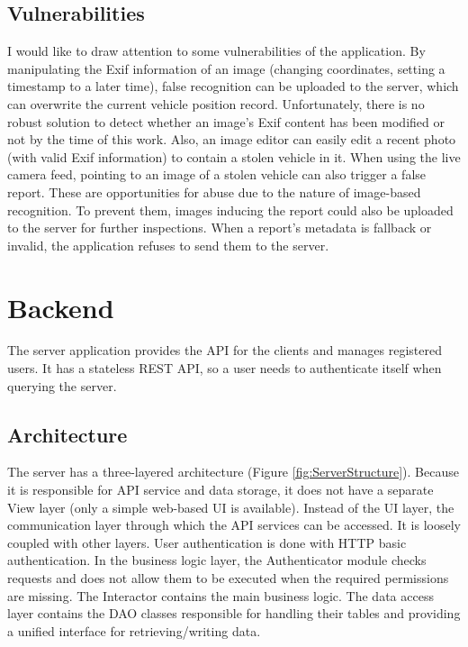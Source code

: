 \subsection{Vulnerabilities}

I would like to draw attention to some vulnerabilities of the application. By manipulating the Exif information of an image (changing coordinates, setting a timestamp to a later time), false recognition can be uploaded to the server, which can overwrite the current vehicle position record. Unfortunately, there is no robust solution to detect whether an image's Exif content has been modified or not by the time of this work. Also, an image editor can easily edit a recent photo (with valid Exif information) to contain a stolen vehicle in it. When using the live camera feed, pointing to an image of a stolen vehicle can also trigger a false report. These are opportunities for abuse due to the nature of image-based recognition. To prevent them, images inducing the report could also be uploaded to the server for further inspections. When a report's metadata is fallback or invalid, the application refuses to send them to the server.

\newpage
\section{Backend}

The server application provides the API for the clients and manages registered users. It has a stateless REST API, so a user needs to authenticate itself when querying the server.

\subsection{Architecture}

The server has a three-layered architecture (Figure \ref{fig:ServerStructure}). Because it is responsible for API service and data storage, it does not have a separate View layer (only a simple web-based UI is available). Instead of the UI layer, the communication layer through which the API services can be accessed. It is loosely coupled with other layers. User authentication is done with HTTP basic authentication. In the business logic layer, the Authenticator module checks requests and does not allow them to be executed when the required permissions are missing. The Interactor contains the main business logic. The data access layer contains the DAO classes responsible for handling their tables and providing a unified interface for retrieving/writing data.

